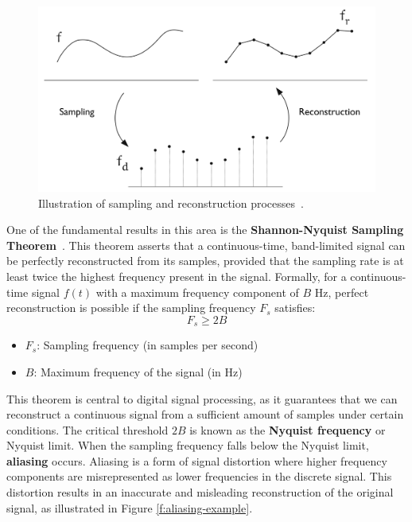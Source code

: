 \begin{figure}[!h]
  \centering
  \includegraphics[width=0.85\linewidth]{img/ch2/sampling-reconstruction.png}
  \caption{Illustration of sampling and reconstruction processes~\citep{ipcgVelho2014}.}
  \label{f:sampling-reconstuction}
\end{figure}


One of the fundamental results in this area is the \textbf{Shannon-Nyquist Sampling Theorem}~\citep{Shannon1949}. This theorem asserts that a continuous-time, band-limited signal can be perfectly reconstructed from its samples, provided that the sampling rate is at least twice the highest frequency present in the signal. Formally, for a continuous-time signal \( f(t) \) with a maximum frequency component of \( B \) Hz, perfect reconstruction is possible if the sampling frequency \( F_s \) satisfies:
\[
F_s \geq 2B
\]

\begin{itemize}
  \item \( F_s \): Sampling frequency (in samples per second)
  \item \( B \): Maximum frequency of the signal (in Hz)
\end{itemize}

This theorem is central to digital signal processing, as it guarantees that we can reconstruct a continuous signal from a sufficient amount of samples under certain conditions. The critical threshold \( 2B \) is known as the \textbf{Nyquist frequency} or Nyquist limit. When the sampling frequency falls below the Nyquist limit, \textbf{aliasing} occurs. Aliasing is a form of signal distortion where higher frequency components are misrepresented as lower frequencies in the discrete signal. This distortion results in an inaccurate and misleading reconstruction of the original signal, as illustrated in Figure \ref{f:aliasing-example}.

